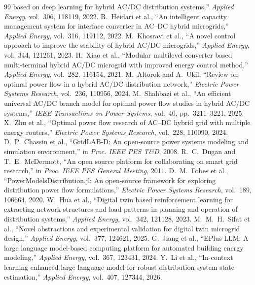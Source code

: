 \documentclass[final,5p,times,twocolumn]{elsarticle}
\begin{document}
\begin{thebibliography}{99}
based on deep learning for hybrid AC/DC distribution systems,'' \emph{Applied
Energy}, vol.~306, 118119, 2022.
 R.~Heidari et al., ``An intelligent capacity
management system for interface converter in AC--DC hybrid microgrids,''
\emph{Applied Energy}, vol.~316, 119112, 2022.
 M.~Khosravi et al., ``A novel control approach
to improve the stability of hybrid AC/DC microgrids,'' \emph{Applied Energy},
vol.~344, 121261, 2023.
 H.~Xiao et al., ``Modular multilevel converter
based multi-terminal hybrid AC/DC microgrid with improved energy control
method,'' \emph{Applied Energy}, vol.~282, 116154, 2021.
 M.~Altorok and A.~Ukil, ``Review on optimal power flow
in a hybrid AC/DC distribution network,'' \emph{Electric Power Systems
Research}, vol.~236, 110956, 2024.
 M.~Shahbazi et al., ``An efficient universal AC/DC
branch model for optimal power flow studies in hybrid AC/DC systems,''
\emph{IEEE Transactions on Power Systems}, vol.~40, pp.~3211--3221, 2025.
 X.~Zhu et al., ``Optimal power flow research
of AC--DC hybrid grid with multiple energy routers,'' \emph{Electric Power
Systems Research}, vol.~228, 110090, 2024.
 D.~P.~Chassin et al., ``GridLAB-D: An open-source power
systems modeling and simulation environment,'' in \emph{Proc. IEEE PES T\&D},
2008.
 R.~C.~Dugan and T.~E.~McDermott, ``An open source platform for
collaborating on smart grid research,'' in \emph{Proc. IEEE PES General Meeting},
2011.
 D.~M.~Fobes et al., ``PowerModelsDistribution.jl: An open-source
framework for exploring distribution power flow formulations,'' \emph{Electric
Power Systems Research}, vol.~189, 106664, 2020.
 W.~Hua et al., ``Digital twin based reinforcement learning
for extracting network structures and load patterns in planning and operation
of distribution systems,'' \emph{Applied Energy}, vol.~342, 121128, 2023.
 M.~M.~H.~Sifat et al., ``Novel abstractions and
experimental validation for digital twin microgrid design,'' \emph{Applied
Energy}, vol.~377, 124621, 2025.
 G.~Jiang et al., ``EPlus-LLM: A large language
model-based computing platform for automated building energy modeling,''
\emph{Applied Energy}, vol.~367, 123431, 2024.
 Y.~Li et al., ``In-context learning enhanced large language
model for robust distribution system state estimation,'' \emph{Applied Energy},
vol.~407, 127344, 2026.

\end{thebibliography}
\end{document}
